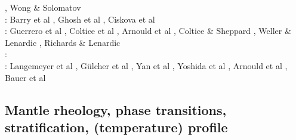 \begin{scriptsize}
                     \cite{vade16}\cite{chah16}, Wong \& Solomatov \cite{woso16b}\\
\twothousandseventeen: Barry et al \cite{badw17}, Ghosh et al \cite{ghts17}, 
                       Ciskova et al \cite{civj17}\\
\twothousandeighteen: Guerrero et al \cite{guld18}, Coltice et al \cite{cold18}, 
                      Arnould et al \cite{arcf18}, Coltice \& Sheppard \cite{cosh18}, 
                      Weller \& Lenardic \cite{wele18}, Richards \& Lenardic \cite{rile18}\\
\twothousandnineteen: \cite{gult19}\cite{mazh19}\cite{cohf19}\cite{lewh19}\cite{ulcw19}\cite{boba19}\cite{fube19}
      \cite{plju19}\\
\twothousandtwenty: Langemeyer et al \cite{lalt20}, G\"ulcher et al \cite{gugb20}, Yan et al \cite{yabt20}, Yoshida et al \cite{yosy20}, Arnould et al \cite{arcf20}, Bauer et al \cite{babd20}
\end{scriptsize}

\subsection{Mantle rheology, phase transitions, stratification, (temperature) profile}

